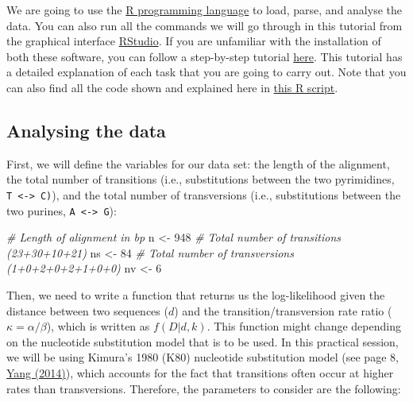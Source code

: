 \documentclass[
]{article}
\newenvironment{Shaded}{\begin{snugshade}}{\end{snugshade}}
\newcommand{\CommentTok}[1]{\textcolor[rgb]{0.56,0.35,0.01}{\textit{#1}}}
\newcommand{\DecValTok}[1]{\textcolor[rgb]{0.00,0.00,0.81}{#1}}
\newcommand{\NormalTok}[1]{#1}
\newcommand{\OtherTok}[1]{\textcolor[rgb]{0.56,0.35,0.01}{#1}}
\begin{document}
We are going to use the \href{https://cran.r-project.org/}{R programming
language} to load, parse, and analyse the data. You can also run all the
commands we will go through in this tutorial from the graphical
interface
\href{https://www.rstudio.com/products/rstudio/download/}{RStudio}. If
you are unfamiliar with the installation of both these software, you can
follow a step-by-step tutorial
\href{https://github.com/sabifo4/RnBash/tree/master/R_installation}{here}.
This tutorial has a detailed explanation of each task that you are going
to carry out. Note that you can also find all the code shown and
explained here in \href{Practical_1.R}{this R script}.

\hypertarget{analysing-the-data}{%
\subsection{Analysing the data}\label{analysing-the-data}}

First, we will define the variables for our data set: the length of the
alignment, the total number of transitions (i.e., substitutions between
the two pyrimidines, \texttt{T\ \textless{}-\textgreater{}\ C)}), and
the total number of transversions (i.e., substitutions between the two
purines, \texttt{A\ \textless{}-\textgreater{}\ G}):

\begin{Shaded}
\begin{Highlighting}[]
\CommentTok{\# Length of alignment in bp}
\NormalTok{n  }\OtherTok{\textless{}{-}} \DecValTok{948}
\CommentTok{\# Total number of transitions (23+30+10+21)}
\NormalTok{ns }\OtherTok{\textless{}{-}} \DecValTok{84}
\CommentTok{\# Total number of transversions (1+0+2+0+2+1+0+0)}
\NormalTok{nv }\OtherTok{\textless{}{-}} \DecValTok{6}
\end{Highlighting}
\end{Shaded}

Then, we need to write a function that returns us the log-likelihood
given the distance between two sequences (\(d\)) and the
transition/transversion rate ratio (\(\kappa=\alpha/\beta\)), which is
written as \(f(D|d,k)\). This function might change depending on the
nucleotide substitution model that is to be used. In this practical
session, we will be using Kimura's 1980 (K80) nucleotide substitution
model (see page 8, \href{http://abacus.gene.ucl.ac.uk/MESA/}{Yang
(2014)}), which accounts for the fact that transitions often occur at
higher rates than transversions. Therefore, the parameters to consider
are the following:
\end{document}

